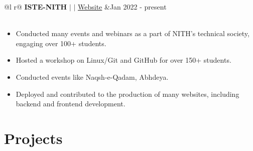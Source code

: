 \documentclass[legalpaper,11pt]{article}
\begin{document}

\begin{tabularx}{\linewidth}{ @{}l r@{} }
\textbf{ISTE-NITH} $|$  $|$ \href{https://www.istenith.com/}{Website} &\hfill Jan 2022 - present \\[3.75pt]
 \\
\end{tabularx}

\begin{itemize}[leftmargin=*,noitemsep,topsep=0pt]
    \item Conducted many events and webinars as a part of NITH's technical society, engaging over 100+ students.
    \item Hosted a workshop on Linux/Git and GitHub for over 150+ students.
    \item Conducted events like Naqsh-e-Qadam, Abhdeya.
    \item Deployed and contributed to the production of many websites, including backend and frontend development.
\end{itemize}


\section{Projects}
\end{document}
